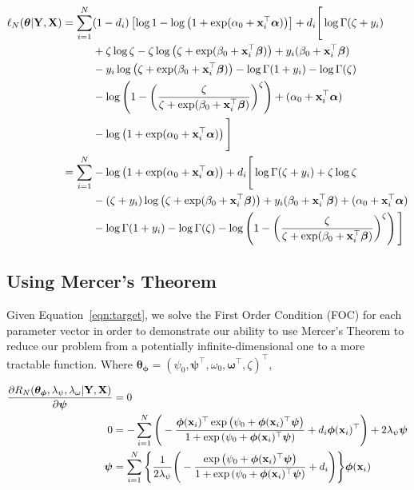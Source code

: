 \documentclass[12pt]{article}
\newcommand{\X}{\mathbf{X}}
\newcommand{\x}{\mathbf{x}}
\newcommand{\Y}{\mathbf{Y}}
\renewcommand{\r}{\right}
\renewcommand{\l}{\left}
\newcommand{\bomega}{\bm{\omega}}
\newcommand{\bpsi}{\bm{\psi}}
\newcommand{\bbeta}{\bm{\beta}}
\newcommand{\balpha}{\bm{\alpha}}
\newcommand{\bphi}{\bm{\phi}}
\newcommand{\btheta}{\bm{\theta}}
\begin{document}
\begin{align}
\ell_N(\btheta | \Y, \X) &= \begin{aligned}[t]
\sum^N_{i=1} &(1 - d_i) \l[ \log 1 - \log \l( 1 + \exp(\alpha_0 + \x^\top_i \balpha) \r) \r] + d_i \Bigg[ \log \Gamma( \zeta + y_i ) \\
& + \zeta \log \zeta - \zeta \log \l( \zeta + \exp(\beta_0 + \x^\top_i \bbeta) \r) + y_i (\beta_0 + \x^\top_i \bbeta) \\
& - y_i \log \l( \zeta + \exp(\beta_0 + \x^\top_i \bbeta) \r) - \log \Gamma (1 + y_i) - \log \Gamma (\zeta) \\
&- \log \l(1 - \l( \frac{\zeta}{\zeta + \exp(\beta_0 + \x^\top_i \bbeta)} \r)^\zeta \r) + (\alpha_0 + \x^\top_i \balpha) \\
& - \log \l(1 + \exp(\alpha_0 + \x^\top_i \balpha) \r) \Bigg]
\end{aligned} \notag \\
 &= \begin{aligned}[t]
  \sum^N_{i=1} & - \log \l(1 + \exp(\alpha_0 + \x^\top_i \balpha) \r) +  d_i \Bigg[ \log \Gamma( \zeta + y_i ) + \zeta \log \zeta \\
  &- (\zeta + y_i) \log \l( \zeta + \exp(\beta_0 + \x^\top_i \bbeta) \r) + y_i(\beta_0 + \x^\top_i \bbeta) + (\alpha_0 + \x^\top_i \balpha) \\
  & - \log \Gamma (1 + y_i) - \log \Gamma (\zeta) - \log \l( 1 - \l( \frac{\zeta}{\zeta + \exp(\beta_0 + \x^\top_i \bbeta)} \r)^\zeta \r) \Bigg]
  \end{aligned}
\end{align} 

\subsection{Using Mercer's Theorem}

Given Equation~\ref{eqn:target}, we solve the First Order Condition (FOC) for each parameter vector in order to demonstrate our ability to use Mercer's Theorem to reduce our problem from a potentially infinite-dimensional one to a more tractable function. Where $\btheta_{\bphi} = (\psi_0, \bpsi^\top, \omega_0, \bomega^\top, \zeta)^\top$,

\begin{align}
\frac{\partial R_N (\btheta_{\bphi}, \lambda_\psi, \lambda_\omega | \Y, \X)}{\partial \bpsi} &= 0 \notag \\
0 &= -\sum^N_{i=1} \Bigg( - \frac{\bphi(\x_i)^\top \exp \l( \psi_0 + \bphi(\x_i)^\top \bpsi \r)}{1 + \exp \l( \psi_0 + \bphi(\x_i)^\top \bpsi \r)} + d_i \bphi(\x_i)^\top \Bigg) + 2 \lambda_\psi \bpsi \notag \\
\bpsi &= \sum^N_{i=1} \Bigg\{ \frac{1}{2 \lambda_\psi} \Bigg( - \frac{\exp \l( \psi_0 + \bphi(\x_i)^\top \bpsi \r)}{1 + \exp \l( \psi_0 + \bphi(\x_i)^\top \bpsi \r)} + d_i \Bigg) \Bigg\} \bphi(\x_i)
\end{align}
\end{document}
